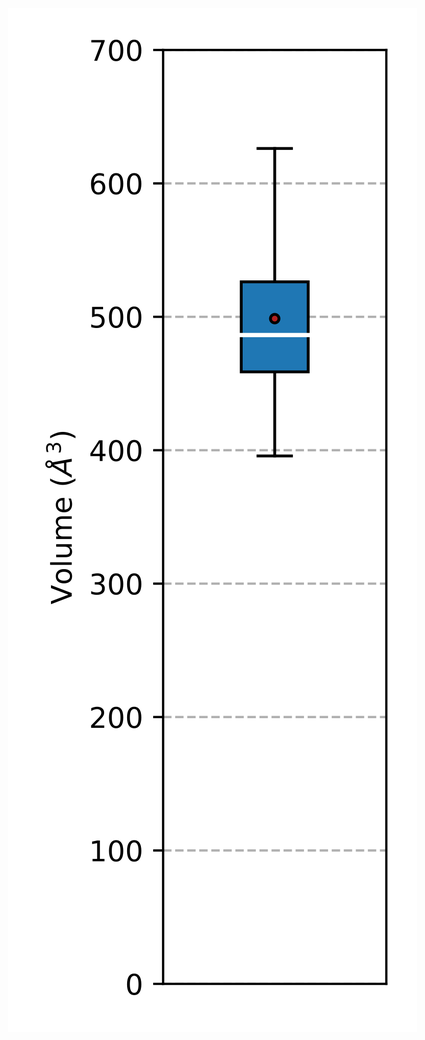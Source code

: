 \documentclass[Portugues]{phdquali}
\begin{document}
\begin{figure}[ht]
  \centering
    \includegraphics[scale=0.5]{images/mayv-c-e2-volume.png}

\end{figure}
\end{document}
